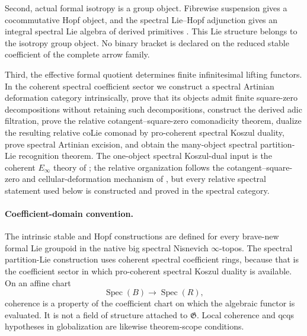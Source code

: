 Second, actual formal isotropy is a group object.  Fibrewise suspension gives
a cocommutative Hopf object, and the spectral Lie--Hopf adjunction gives an
integral spectral Lie algebra of derived primitives
\cite{Ching2005,Heine2024}.  This Lie structure belongs to the isotropy group
object.  No binary bracket is declared on the reduced stable coefficient of
the complete arrow family.

Third, the effective formal quotient determines finite infinitesimal lifting
functors.  In the coherent spectral coefficient sector we construct a
spectral Artinian deformation category intrinsically, prove that its objects
admit finite square-zero decompositions without retaining such decompositions,
construct the derived adic filtration, prove the relative
cotangent--square-zero comonadicity theorem, dualize the resulting relative
coLie comonad by pro-coherent spectral Koszul duality, prove spectral Artinian
excision, and obtain the many-object spectral partition-Lie recognition
theorem.  The one-object spectral Koszul-dual input is the coherent
$E_\infty$ theory of \cite{BrantnerCamposNuiten2025}; the relative
organization follows the cotangent--square-zero and cellular-deformation
mechanism of \cite{BrantnerMagidsonNuiten2025}, but every relative spectral
statement used below is constructed and proved in the spectral category.

\paragraph{Coefficient-domain convention.}
The intrinsic stable and Hopf constructions are defined for every brave-new
formal Lie groupoid in the native big spectral Nisnevich $\infty$-topos.
The spectral partition-Lie construction uses coherent spectral coefficient
rings, because that is the coefficient sector in which pro-coherent spectral
Koszul duality is available.  On an affine chart
\[
    \operatorname{Spec}(B)\longrightarrow\operatorname{Spec}(R),
\]
coherence is a property of the coefficient chart on which the algebraic
functor is evaluated.  It is not a field of structure attached to
$\mathfrak G$.  Local coherence and qcqs hypotheses in globalization are
likewise theorem-scope conditions.

